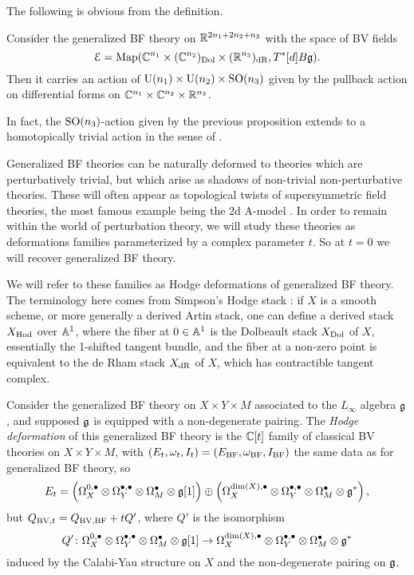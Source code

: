 \documentclass[10pt, oneside]{article}
\renewcommand{\U}{\mathrm{U}}
\begin{document}
The following is obvious from the definition.

\begin{prop}
Consider the generalized BF theory on $\mathbb R^{2n_1+2n_2+n_3}$ with the space of BV fields
\[\mathcal E = \operatorname{Map}(\mathbb C^{n_1}\times (\mathbb C^{n_2})_{\mathrm{Dol}}\times (\mathbb R^{n_3})_{\mathrm{dR}}, T^*[d] B\mathfrak g).\]
Then it carries an action of $\U(n_1)\times \U(n_2)\times \SO(n_3)$ given by the pullback action on differential forms on $\mathbb C^{n_1}\times \mathbb C^{n_2}\times \mathbb R^{n_3}$.
\label{prop:BFrotationaction}
\end{prop}

\begin{remark}
In fact, the $\mathrm{SO}(n_3)$-action given by the previous proposition extends to a homotopically trivial action in the sense of \cite[Section 2.4]{ElliottSafronov}.
\end{remark}

Generalized BF theories can be naturally deformed to theories which are perturbatively trivial, but which arise as shadows of non-trivial non-perturbative theories.  These will often appear as topological twists of supersymmetric field theories, the most famous example being the 2d A-model .  In order to remain within the world of perturbation theory, we will study these theories as deformations families parameterized by a complex parameter $t$.  So at $t=0$ we will recover generalized BF theory.

We will refer to these families as Hodge deformations of generalized BF theory.  The terminology here comes from Simpson's Hodge stack \cite{Simpson}: if $X$ is a smooth scheme, or more generally a derived Artin stack, one can define a derived stack $X_{\mathrm{Hod}}$ over $\mathbb{A}^1$, where the fiber at $0 \in \mathbb{A}^1$ is the Dolbeault stack $X_{\mathrm{Dol}}$ of $X$, essentially the 1-shifted tangent bundle, and the fiber at a non-zero point is equivalent to the de Rham stack $X_{\mathrm{dR}}$ of $X$, which has contractible tangent complex.

\begin{definition} \label{Hodge_family_def}
Consider the generalized BF theory on $X \times Y \times M$ associated to the $L_\infty$ algebra $\mathfrak g$, and supposed $\mathfrak g$ is equipped with a non-degenerate pairing.  The \emph{Hodge deformation} of this generalized BF theory is the $\mathbb C[t]$ family of classical BV theories on $X \times Y \times M$, with $(E_t, \omega_t, I_t) = (E_{\mathrm{BF}}, \omega_{\mathrm{BF}}, I_{\mathrm{BF}})$ the same data as for generalized BF theory, so 
\[E_t = \left(\Omega^{0,\bullet}_X \otimes \Omega^{\bullet,\bullet}_Y \otimes \Omega^\bullet_M \otimes \mathfrak g[1] \right)\oplus \left(\Omega^{\dim(X),\bullet}_X \otimes \Omega^{\bullet,\bullet}_Y \otimes \Omega^\bullet_M\otimes \mathfrak g^*\right),\]
but $Q_{\mathrm{BV},t} = Q_{\text{BV,BF}} + tQ'$, where $Q'$ is the isomorphism
\[Q' \colon \Omega^{0,\bullet}_X \otimes \Omega^{\bullet,\bullet}_Y \otimes \Omega^\bullet_M \otimes \mathfrak g[1] \to 
\Omega^{\dim(X),\bullet}_X \otimes \Omega^{\bullet,\bullet}_Y \otimes \Omega^\bullet_M\otimes \mathfrak g^*\]
induced by the Calabi-Yau structure on $X$ and the non-degenerate pairing on $\mathfrak g$. 
\end{definition}
\end{document}
